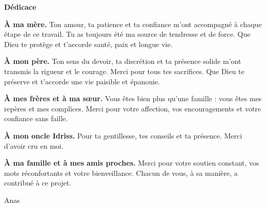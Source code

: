 \begin{titlepage}
  \begin{center}
    \vspace*{4cm}
    {\Huge \textbf{Dédicace}}

    \vspace{2cm}

    \begin{minipage}{0.85\textwidth}
      \onehalfspacing

      \textbf{À ma mère.}  
      Ton amour, ta patience et ta confiance m’ont accompagné à chaque étape de ce travail.  
      Tu as toujours été ma source de tendresse et de force.  
      Que Dieu te protège et t’accorde santé, paix et longue vie.

      \vspace{0.3cm}

      \textbf{À mon père.}  
      Ton sens du devoir, ta discrétion et ta présence solide m’ont transmis la rigueur et le courage.  
      Merci pour tous tes sacrifices.  
      Que Dieu te préserve et t’accorde une vie paisible et épanouie.

      \vspace{0.3cm}

      \textbf{À mes frères et à ma sœur.}  
      Vous êtes bien plus qu’une famille : vous êtes mes repères et mes complices.  
      Merci pour votre affection, vos encouragements et votre confiance sans faille.

      \vspace{0.3cm}

      \textbf{À mon oncle Idriss.}  
      Pour ta gentillesse, tes conseils et ta présence. Merci d’avoir cru en moi.

      \vspace{0.3cm}

      \textbf{À ma famille et à mes amis proches.}  
      Merci pour votre soutien constant, vos mots réconfortants et votre bienveillance.  
      Chacun de vous, à sa manière, a contribué à ce projet.

      \vspace{0.8cm}

      \begin{flushright}
        Anas
      \end{flushright}
    \end{minipage}
  \end{center}\end{titlepage}
\restoregeometry

